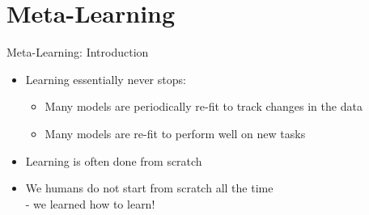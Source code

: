 \section{Meta-Learning}
\begin{frame}[c]{Meta-Learning: Introduction}

\begin{itemize}
	\item Learning essentially never stops:
	\begin{itemize}
		\item Many models are periodically re-fit to track changes in the data
		\item Many models are re-fit to perform well on new tasks
	\end{itemize}
	
    \item Learning is often done from scratch
    
    \item We humans do not start from scratch all the time \\ - we learned how to learn!
\end{itemize}

\end{frame}
